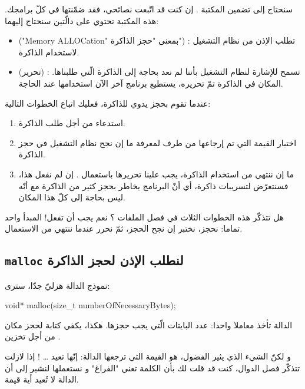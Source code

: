 سنحتاج إلى تضمين المكتبة
.
إن كنت قد اتّبعت نصائحي، فقد ضمّنتها في كلّ برامجك. هذه المكتبة تحتوي على دالّتين سنحتاج إليهما:

\begin{itemize}
  \item {} ("\textenglish{Memory ALLOCation}"
بمعنى "حجز الذاكرة") : تطلب الإذن من نظام التشغيل لاستخدام الذاكرة.
  \item {}
(تحرير) : تسمح للإشارة لنظام التشغيل بأننا لم نعد بحاجة إلى الذاكرة الّتي طلبناها. المكان في الذاكرة تمّ تحريره، يستطيع برنامج آخر الآن استخدامها عند الحاجة.
\end{itemize}

عندما تقوم بحجز يدوي للذاكرة، فعليك اتباع الخطوات التالية:

\begin{enumerate}
  \item استدعاء
من أجل طلب الذاكرة.
  \item اختبار القيمة التي تم إرجاعها من طرف
لمعرفة ما إن نجح نظام التشغيل في حجز الذاكرة.
  \item ما إن ننتهي من استخدام الذاكرة، يجب علينا تحريرها باستعمال
.
إن لم نفعل هذا، فسنتعرّض لتسريبات ذاكرة، أي أنّ البرنامج يخاطر بحجز كثير من الذاكرة مع أنّه ليس بحاجة إلى كلّ هذا المكان.
\end{enumerate}

هل تتذكّر هذه الخطوات الثلاث في فصل الملفات ؟ نعم يجب أن تفعل! المبدأ واحد تماما: نحجز، نختبر إن نجح الحجز، ثمّ نحرر عندما ننتهي من الاستعمال.

\subsection{\texttt{malloc} لنطلب الإذن لحجز الذاكرة}
نموذج الدالة
هزليّ جدّا، سترى:

\begin{Csource}
void* malloc(size_t numberOfNecessaryBytes);
\end{Csource}

الدالة تأخذ معاملا واحدا: عدد البايتات الّتي يجب حجزها. هكذا، يكفي كتابة
لحجز مكان من أجل تخزين
.

و لكنّ الشيء الذي يثير الفضول، هو القيمة التي ترجعها الدالة: إنّها تعيد \dots
{} !
إذا لازلت تتذكّر فصل الدوال، كنت قد قلت لك بأن الكلمة
تعني "الفراغ" و نستعملها لنشير إلى أن الدالة لا تُعيد أية قيمة.

